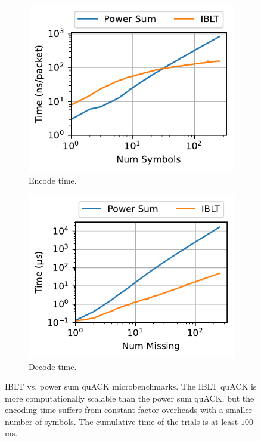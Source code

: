 \begin{figure}[t]
    \centering
    \begin{subfigure}[b]{0.37\linewidth}
        \centering
        \includegraphics[width=\linewidth]{quack/figures/quack_encode.pdf}
        \caption{Encode time.}
        \label{fig:quack:iblt-computation:encode}
    \end{subfigure}
    \begin{subfigure}[b]{0.37\linewidth}
        \centering
        \includegraphics[width=\linewidth]{quack/figures/quack_decode.pdf}
        \caption{Decode time.}
        \label{fig:quack:iblt-computation:decode}
    \end{subfigure}
    \caption{IBLT vs. power sum quACK microbenchmarks. The IBLT quACK is more
     computationally scalable than the power sum quACK, but the encoding time
     suffers from constant factor overheads with a smaller number of symbols.
     The cumulative time of the trials is at least $100$ ms.
     }
    \label{fig:quack:iblt-computation}
\end{figure}